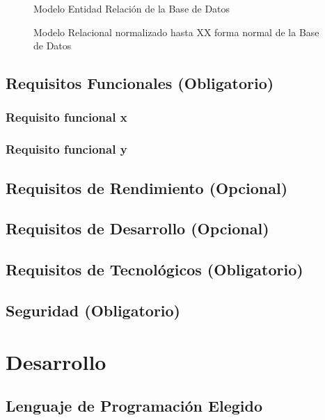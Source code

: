 \documentclass[letter,12pt]{report}
\newcommand\rojo[1]{\textcolor[rgb]{1,0,0}{#1}}
\begin{document}
\begin{landscape}
\begin{figure}[hbt]
  \centering
  \caption{Modelo Entidad Relación de la Base de Datos}
  \label{MER}
\end{figure}
\end{landscape}

\begin{landscape}
\begin{figure}[hbt]
  \centering
  \caption{Modelo Relacional normalizado hasta XX forma normal de la Base de Datos}
  \label{MRnormalizado}
\end{figure}
\end{landscape}

\section{Requisitos Funcionales (\rojo{Obligatorio})}
\subsection{Requisito funcional x}
\subsection{Requisito funcional y}
\section{Requisitos de Rendimiento (\rojo{Opcional})}
\section{Requisitos de Desarrollo (\rojo{Opcional})}
\section{Requisitos de Tecnológicos (\rojo{Obligatorio})}
\section{Seguridad (\rojo{Obligatorio})}

\chapter{Desarrollo}
\section{Lenguaje de Programación Elegido}
\end{document}
